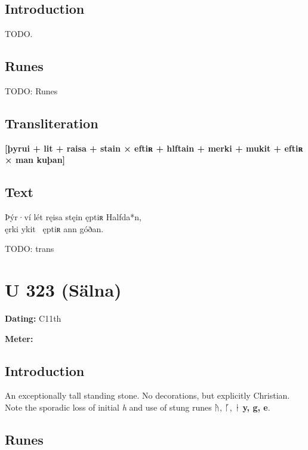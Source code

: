 \subsection{Introduction}

TODO.

\subsection{Runes}

TODO: Runes%

\subsection{Transliteration}

\textbf{[þyrui + lit + raisa + stain × eftiʀ + hlftain + merki + mukit + eftiʀ × man kuþan]}

\subsection{Text}

\bpg\bpa[0]%
Þýr·ví lét ręisa stęin ęptiʀ Halfda*n, \\
ęrki ykit \hld\ ęptiʀ ann góðan.\epa

\bpb TODO: trans\epb\epg

\sectionline\clearpage


\section{U 323 (Sälna)}

\begin{flushright}%
\textbf{Dating:} C11th

\textbf{Meter:} \Fornyrdislag
\end{flushright}%

\subsection{Introduction}

An exceptionally tall standing stone.  No decorations, but explicitly Christian.  Note the sporadic loss of initial \emph{h} and use of stung runes ᚤ, ᚵ, ᛂ \textbf{y, g, e}.

\subsection{Runes}

